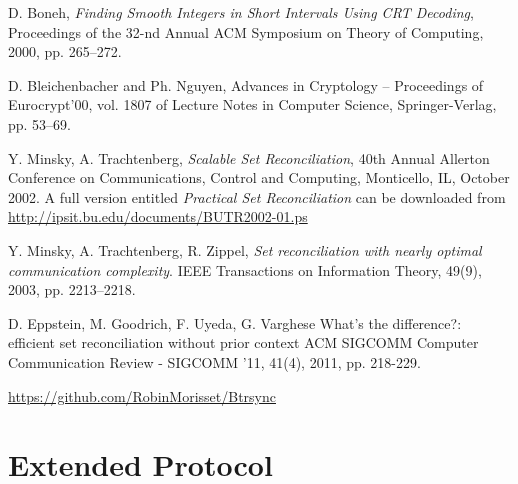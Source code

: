 \documentclass[11pt]{llncs}
\begin{document}
\nocite{rsync}
\nocite{wagner}




\begin{thebibliography}{30}

 D. Boneh, {\sl Finding Smooth Integers in Short Intervals Using CRT Decoding}, Proceedings of the 32-nd Annual ACM Symposium on Theory of Computing, 2000, pp. 265--272.

 D. Bleichenbacher and Ph. Nguyen, Advances in Cryptology -- Proceedings of Eurocrypt'00, vol. 1807 of Lecture Notes in Computer Science, Springer-Verlag, pp. 53--69.

 Y. Minsky, A. Trachtenberg, {\sl Scalable Set Reconciliation}, 40th Annual Allerton Conference on Communications, Control and Computing, Monticello, IL, October 2002. A full version entitled {\sl Practical Set Reconciliation} can be downloaded from \url{http://ipsit.bu.edu/documents/BUTR2002-01.ps}

 Y. Minsky, A. Trachtenberg, R. Zippel, {\sl Set reconciliation with nearly optimal communication complexity}. IEEE Transactions on Information Theory, 49(9), 2003, pp. 2213–2218.

 D. Eppstein, M. Goodrich, F. Uyeda, G. Varghese What's the difference?: efficient set reconciliation without prior context
ACM SIGCOMM Computer Communication Review - SIGCOMM '11, 41(4), 2011, pp. 218-229.

 \url{https://github.com/RobinMorisset/Btrsync}

\end{thebibliography}

\appendix

\section{Extended Protocol}
\end{document}
